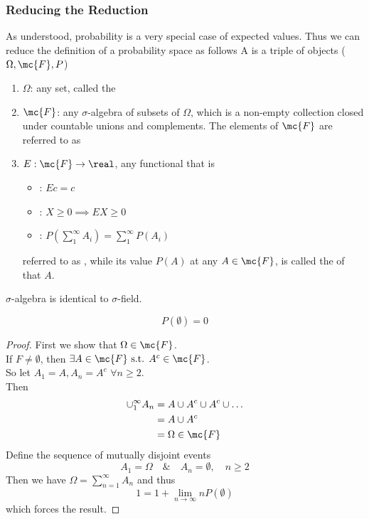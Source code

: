 \documentclass[11pt]{article}
\numberwithin{equation}{section}
\begin{document}
\subsubsection{Reducing the Reduction}
As understood, probability is a very special case of expected values. Thus we can reduce the definition of a probability space as follows
A  is a triple of objects ($\Omega, \mc{F}, P$)
\begin{enumerate}
	\item $\Omega$: any set, called the 
	\item $\mc{F}$: any $\sigma$-algebra of subsets of $\Omega$, which is a non-empty collection closed under countable unions and complements. The elements of $\mc{F}$ are referred to as 
	\item $E: \mc{F} \rightarrow \real$, any functional that is 
	\begin{itemize}
		\item {}: $Ec = c$
		\item {}: $X \geq 0 \implies EX \geq 0$
		\item {}: $P(\sum_1^{\infty}A_i) = \sum_1^{\infty}P(A_i)$
	\end{itemize}
	referred to as , while its value $P(A)$ at any $A \in \mc{F}$, is called the  of that $A$.
\end{enumerate} 

\remark
$\sigma$-algebra is identical to $\sigma$-field.

\proposition[nullity]
$$P(\emptyset) = 0$$
\begin{proof}
	First we show that $\Omega \in \mc{F}$. \\
	If $F \neq \emptyset$, then $\exists A \in \mc{F} \text{ s.t. } A^c \in \mc{F}$. \\
	So let $A_1 = A, A_n = A^c \,\, \forall n \geq 2$. \\
	Then 
	\begin{align}
		\cup_1^\infty A_n &= A \cup A^c \cup A^c \cup \hdots \\
		&= A \cup A^c \\
		&= \Omega \in \mc{F}
	\end{align}
	Define the sequence of mutually disjoint events
	$$A_1 = \Omega \quad \& \quad A_n = \emptyset, \quad n \geq 2$$
	Then we have $\Omega = \sum_{n=1}^\infty A_n$ and thus 
	$$ 1 = 1 + \lim_{n\rightarrow\infty} nP(\emptyset)$$
	which forces the result.
\end{proof}
\end{document}
